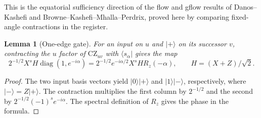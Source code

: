 \documentclass[aps,pra,onecolumn,superscriptaddress,nofootinbib,10pt]{revtex4-2}
\newtheorem{lemma}[theorem]{Lemma}
\theoremstyle{definition}
\theoremstyle{remark}
\begin{document}
This is the equatorial sufficiency direction of the flow and gflow results of Danos--Kashefi and Browne--Kashefi--Mhalla--Perdrix, proved here by comparing fixed-angle contractions in the register. \cite{n5-flow,n5-gflow}

\begin{lemma}[One-edge gate]\label{cp:edge}
For an input on $u$ and $|+\rangle$ on its successor $v$, contracting the $u$ factor of $\mathrm{CZ}_{uv}$ with $\langle s_\alpha|$ gives the map
\[
 2^{-1/2}X^s H\operatorname{diag}(1,e^{-i\alpha})
 =2^{-1/2}e^{-i\alpha/2}X^s H R_z(-\alpha),
 \qquad H=(X+Z)/\sqrt2 .
\]
\end{lemma}
\begin{proof}
The two input basis vectors yield $|0\rangle|+\rangle$ and $|1\rangle|-\rangle$, respectively, where $|-\rangle=Z|+\rangle$. The contraction multiplies the first column by $2^{-1/2}$ and the second by $2^{-1/2}(-1)^s e^{-i\alpha}$. The spectral definition of $R_z$ gives the phase in the formula.
\end{proof}
\end{document}
